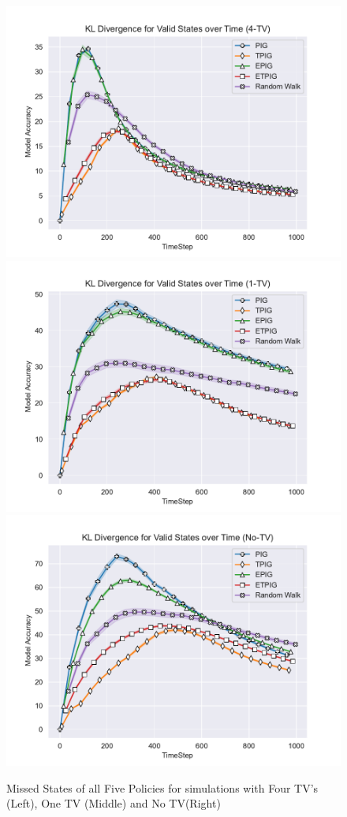 \documentclass[12pt]{thesis}
\begin{document}
\begin{figure}
\begin{center}
	\end{center}
	\caption{Missed States of all Five Policies for simulations with Four TV's (Left), One TV (Middle) and No TV(Right)}
	\label{Fig:MSFP}
	\begin{center}
		\includegraphics[scale=0.46]{"images/Model_Accuracy_4-TV.pdf"}
		\includegraphics[scale=0.46]{"images/Model_Accuracy_1-TV.pdf"}
		\includegraphics[scale=0.46]{"images/Model_Accuracy_No-TV.pdf"}

\end{center}
\end{figure}
\end{document}
